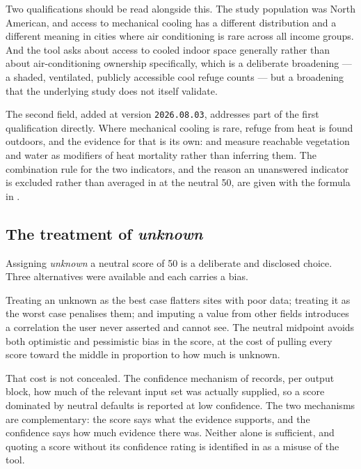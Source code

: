 Two qualifications should be read alongside this. The study population was
North American, and access to mechanical cooling has a different distribution
and a different meaning in cities where air conditioning is rare across all
income groups. And the tool asks about access to cooled indoor space generally
rather than about air-conditioning ownership specifically, which is a
deliberate broadening --- a shaded, ventilated, publicly accessible cool refuge
counts --- but a broadening that the underlying study does not itself
validate.

The second field, added at version \texttt{2026.08.03}, addresses part of the
first qualification directly. Where mechanical cooling is rare, refuge from
heat is found outdoors, and the evidence for that is its own:
\textcite{burkart2016} and \textcite{sera2019} measure reachable vegetation and
water as modifiers of heat mortality rather than inferring them. The
combination rule for the two indicators, and the reason an unanswered indicator
is excluded rather than averaged in at the neutral 50, are given with the
formula in .

\subsection{The treatment of \emph{unknown}}
\label{sec:unknown}

Assigning \emph{unknown} a neutral score of 50 is a deliberate and disclosed
choice. Three alternatives were available and each carries a bias.

Treating an unknown as the best case flatters sites with poor data; treating it
as the worst case penalises them; and imputing a value from other fields
introduces a correlation the user never asserted and cannot see. The neutral
midpoint avoids both optimistic and pessimistic bias in the score, at the cost
of pulling every score toward the middle in proportion to how much is unknown.

That cost is not concealed. The confidence mechanism of 
records, per output block, how much of the relevant input set was actually
supplied, so a score dominated by neutral defaults is reported at low
confidence. The two mechanisms are complementary: the score says what the
evidence supports, and the confidence says how much evidence there was. Neither
alone is sufficient, and quoting a score without its confidence rating is
identified in  as a misuse of the tool.


